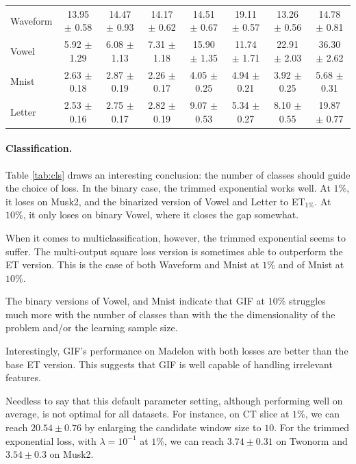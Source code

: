 \documentclass{article}
\newcommand{\bestA}{\cellcolor{orange}}
\newcommand{\bestB}{\cellcolor{dodgerblue}}
\begin{document}
\begin{table}[t]
\begin{center}
\begin{footnotesize}
\begin{sc}
\begin{tabular}{l|c|ccc|ccc}
\hline
Waveform & 13.95 $\pm$ 0.58 & 14.47 $\pm$ 0.93 & \bestA 14.17 $\pm$ 0.62 & 
14.51 $\pm$ 0.67 & 19.11 $\pm$ 0.57 & \bestB 13.26 $\pm$ 0.56 & 14.78 $\pm$ 
0.81 \\
Vowel & 5.92 $\pm$ 1.29 & \bestA 6.08 $\pm$ 1.13 & 7.31 $\pm$ 1.18 & 15.90 
$\pm$ 1.35 & \bestB 11.74 $\pm$ 1.71 & 22.91 $\pm$ 2.03 & 36.30 $\pm$ 2.62 \\
Mnist & 2.63 $\pm$ 0.18 & 2.87 $\pm$ 0.19 & \bestA 2.26 $\pm$ 0.17 & 4.05 $\pm$ 
0.25 & 4.94 $\pm$ 0.21 & \bestB 3.92 $\pm$ 0.25 & 5.68 $\pm$ 0.31 \\
Letter & 2.53 $\pm$ 0.16 & \bestA 2.75 $\pm$ 0.17 & 2.82 $\pm$ 0.19 & 9.07 
$\pm$ 0.53 & \bestB 5.34 $\pm$ 0.27 & 8.10 $\pm$ 0.55 & 19.87 $\pm$ 0.77 \\
\hline
\end{tabular}
\end{sc}
\end{footnotesize}
\end{center}
\vskip -0.2in
\end{table}


\paragraph{Classification.}
Table \ref{tab:cls} draws an interesting conclusion: the number of classes 
should guide the choice of loss. In the binary case, the trimmed exponential 
works well. At $1\%$, it loses on Musk2, and the binarized version of 
Vowel and Letter to ET$_{1\%}$. At $10\%$, it only loses on binary Vowel, where 
it closes the gap somewhat.

When it comes to multiclassification, however, the trimmed exponential seems to 
suffer. The multi-output square loss version is sometimes able to outperform 
the ET version. This is the case of both Waveform and Mnist at $1\%$ and of 
Mnist at $10\%$. 

The binary versions of Vowel, and Mnist indicate that GIF at $10\%$ 
struggles much more with the number of classes than with the the dimensionality 
of the problem and/or the learning sample size. 

Interestingly, GIF's performance on Madelon with both losses are better than 
the base ET version. This suggests that GIF is well capable of handling 
irrelevant features.

Needless to say that this default parameter setting, although performing well 
on average, is not optimal for all datasets. For instance, on CT slice at 
$1\%$, we can reach $20.54 \pm 0.76$ by enlarging the candidate window size 
to $10$. 
For the trimmed exponential loss, with $\lambda = 10^{-1}$ at $1\%$, we can 
reach $3.74 \pm 0.31$ on Twonorm and $3.54 \pm 0.3$ on Musk2.
\end{document}
